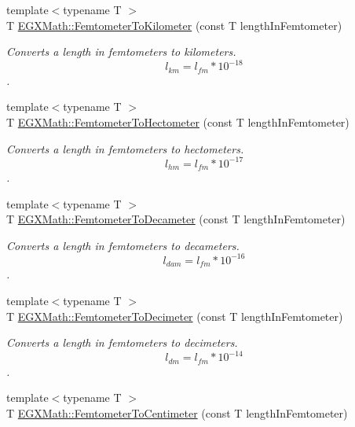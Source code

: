\begin{DoxyCompactItemize}
{\footnotesize template$<$typename T $>$ }\\T \mbox{\hyperlink{group___e_g_x_math-_conversions-_length_conversions-_femtometer-_s_i_ga539d33a130ba1069fe9dfaea944cd4ed}{E\+G\+X\+Math\+::\+Femtometer\+To\+Kilometer}} (const T length\+In\+Femtometer)
\begin{DoxyCompactList}\small\item\em Converts a length in femtometers to kilometers. \[ l_{km}=l_{fm} * 10^{-18} \]. \end{DoxyCompactList}\item 
{\footnotesize template$<$typename T $>$ }\\T \mbox{\hyperlink{group___e_g_x_math-_conversions-_length_conversions-_femtometer-_s_i_gae889d6c7cbcb59336da14db49d503935}{E\+G\+X\+Math\+::\+Femtometer\+To\+Hectometer}} (const T length\+In\+Femtometer)
\begin{DoxyCompactList}\small\item\em Converts a length in femtometers to hectometers. \[ l_{hm}=l_{fm} * 10^{-17} \]. \end{DoxyCompactList}\item 
{\footnotesize template$<$typename T $>$ }\\T \mbox{\hyperlink{group___e_g_x_math-_conversions-_length_conversions-_femtometer-_s_i_ga8d583b77d39b4474a8081997067ffb66}{E\+G\+X\+Math\+::\+Femtometer\+To\+Decameter}} (const T length\+In\+Femtometer)
\begin{DoxyCompactList}\small\item\em Converts a length in femtometers to decameters. \[ l_{dam}=l_{fm} * 10^{-16} \]. \end{DoxyCompactList}\item 
{\footnotesize template$<$typename T $>$ }\\T \mbox{\hyperlink{group___e_g_x_math-_conversions-_length_conversions-_femtometer-_s_i_gad0f3dba7d53c7f17223b7f7b0f4db523}{E\+G\+X\+Math\+::\+Femtometer\+To\+Decimeter}} (const T length\+In\+Femtometer)
\begin{DoxyCompactList}\small\item\em Converts a length in femtometers to decimeters. \[ l_{dm}=l_{fm} * 10^{-14} \]. \end{DoxyCompactList}\item 
{\footnotesize template$<$typename T $>$ }\\T \mbox{\hyperlink{group___e_g_x_math-_conversions-_length_conversions-_femtometer-_s_i_ga9a7e58a22b438341f8fffc8d78dd8483}{E\+G\+X\+Math\+::\+Femtometer\+To\+Centimeter}} (const T length\+In\+Femtometer)

\end{DoxyCompactItemize}
